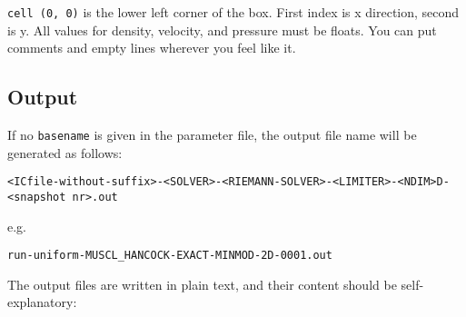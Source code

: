 \texttt{cell\ (0,\ 0)} is the lower left corner of the box. First index is x
direction, second is y. All values for density, velocity, and pressure must be
floats. You can put comments and empty lines wherever you feel like it.











\subsection{Output}




If no \texttt{basename} is given in the parameter file, the output file
name will be generated as follows:

\begin{lstlisting}
<ICfile-without-suffix>-<SOLVER>-<RIEMANN-SOLVER>-<LIMITER>-<NDIM>D-<snapshot nr>.out
\end{lstlisting}

e.g.

\begin{lstlisting}
run-uniform-MUSCL_HANCOCK-EXACT-MINMOD-2D-0001.out
\end{lstlisting}

The output files are written in plain text, and their content should be
self-explanatory:

